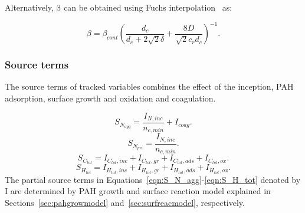 Alternatively, $\mathrm{\beta}$ can be obtained using Fuchs interpolation~\citep{fuchs1965mechanics} as:

\begin{equation}
	\beta = \beta_{cont}
	\left(
		\frac{d_c}{d_c+2\sqrt{2}\delta} +
		\frac{8D}{\sqrt{2}c_r d_c}
	\right)^{-1}
	\label{eqn:betafuchsmono}.
\end{equation}

\subsubsection{Source terms}
The source terms of tracked variables combines the effect of the inception, PAH adsorption, surface growth and oxidation and coagulation.

\begin{equation}
	S_{N_{agg}} = \frac{I_{N,inc}}{n_{c,min}}+I_{coag}
	\label{eqn:S_N_agg}.
\end{equation}
\begin{equation}
	S_{N_{pri}} = \frac{I_{N,inc}}{n_{c,min}}
	\label{eqn:S_N_pri}.
\end{equation}
\begin{equation}
	S_{C_{tot}} = I_{C_{tot},inc}+I_{C_{tot},gr}+I_{C_{tot},ads}+I_{C_{tot},ox}
	\label{eqn:S_C_tot}.
\end{equation}
\begin{equation}
	S_{H_{tot}} = I_{H_{tot},inc}+I_{H_{tot},gr}+I_{H_{tot},ads}+I_{H_{tot},ox}
	\label{eqn:S_H_tot}.
\end{equation}
The partial source terms in Equations~\ref{eqn:S_N_agg}-\ref{eqn:S_H_tot} denoted by $\mathrm{I}$ are determined by PAH growth and surface reaction model explained in Sections~\ref{sec:pahgrowmodel} and~\ref{sec:surfreacmodel}, respectively.

